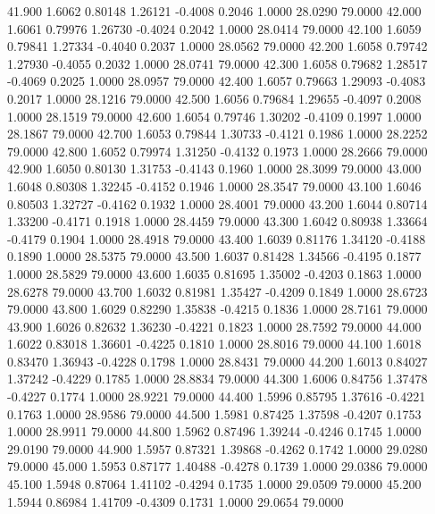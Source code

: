   41.900   1.6062   0.80148   1.26121  -0.4008   0.2046   1.0000  28.0290  79.0000
  42.000   1.6061   0.79976   1.26730  -0.4024   0.2042   1.0000  28.0414  79.0000
  42.100   1.6059   0.79841   1.27334  -0.4040   0.2037   1.0000  28.0562  79.0000
  42.200   1.6058   0.79742   1.27930  -0.4055   0.2032   1.0000  28.0741  79.0000
  42.300   1.6058   0.79682   1.28517  -0.4069   0.2025   1.0000  28.0957  79.0000
  42.400   1.6057   0.79663   1.29093  -0.4083   0.2017   1.0000  28.1216  79.0000
  42.500   1.6056   0.79684   1.29655  -0.4097   0.2008   1.0000  28.1519  79.0000
  42.600   1.6054   0.79746   1.30202  -0.4109   0.1997   1.0000  28.1867  79.0000
  42.700   1.6053   0.79844   1.30733  -0.4121   0.1986   1.0000  28.2252  79.0000
  42.800   1.6052   0.79974   1.31250  -0.4132   0.1973   1.0000  28.2666  79.0000
  42.900   1.6050   0.80130   1.31753  -0.4143   0.1960   1.0000  28.3099  79.0000
  43.000   1.6048   0.80308   1.32245  -0.4152   0.1946   1.0000  28.3547  79.0000
  43.100   1.6046   0.80503   1.32727  -0.4162   0.1932   1.0000  28.4001  79.0000
  43.200   1.6044   0.80714   1.33200  -0.4171   0.1918   1.0000  28.4459  79.0000
  43.300   1.6042   0.80938   1.33664  -0.4179   0.1904   1.0000  28.4918  79.0000
  43.400   1.6039   0.81176   1.34120  -0.4188   0.1890   1.0000  28.5375  79.0000
  43.500   1.6037   0.81428   1.34566  -0.4195   0.1877   1.0000  28.5829  79.0000
  43.600   1.6035   0.81695   1.35002  -0.4203   0.1863   1.0000  28.6278  79.0000
  43.700   1.6032   0.81981   1.35427  -0.4209   0.1849   1.0000  28.6723  79.0000
  43.800   1.6029   0.82290   1.35838  -0.4215   0.1836   1.0000  28.7161  79.0000
  43.900   1.6026   0.82632   1.36230  -0.4221   0.1823   1.0000  28.7592  79.0000
  44.000   1.6022   0.83018   1.36601  -0.4225   0.1810   1.0000  28.8016  79.0000
  44.100   1.6018   0.83470   1.36943  -0.4228   0.1798   1.0000  28.8431  79.0000
  44.200   1.6013   0.84027   1.37242  -0.4229   0.1785   1.0000  28.8834  79.0000
  44.300   1.6006   0.84756   1.37478  -0.4227   0.1774   1.0000  28.9221  79.0000
  44.400   1.5996   0.85795   1.37616  -0.4221   0.1763   1.0000  28.9586  79.0000
  44.500   1.5981   0.87425   1.37598  -0.4207   0.1753   1.0000  28.9911  79.0000
  44.800   1.5962   0.87496   1.39244  -0.4246   0.1745   1.0000  29.0190  79.0000
  44.900   1.5957   0.87321   1.39868  -0.4262   0.1742   1.0000  29.0280  79.0000
  45.000   1.5953   0.87177   1.40488  -0.4278   0.1739   1.0000  29.0386  79.0000
  45.100   1.5948   0.87064   1.41102  -0.4294   0.1735   1.0000  29.0509  79.0000
  45.200   1.5944   0.86984   1.41709  -0.4309   0.1731   1.0000  29.0654  79.0000
